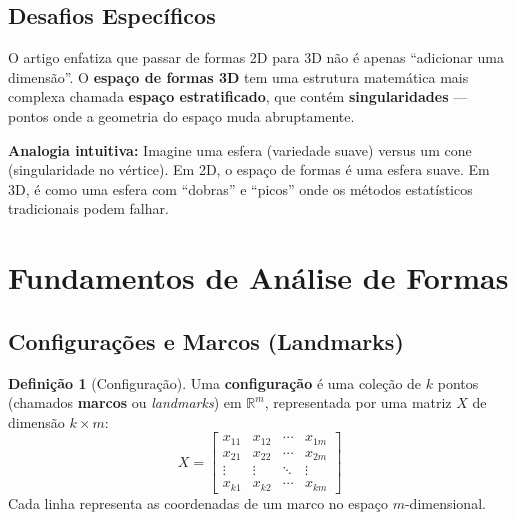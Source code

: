 \documentclass[12pt,a4paper]{article}
\theoremstyle{definition}
\newtheorem{definicao}{Definição}[section]
\begin{document}
\subsection{Desafios Específicos}

\begin{tcolorbox}[caixaimportante={Por que formas 3D são mais difíceis que 2D?}]
O artigo enfatiza que passar de formas 2D para 3D não é apenas ``adicionar uma dimensão''. O \textbf{espaço de formas 3D} tem uma estrutura matemática mais complexa chamada \textbf{espaço estratificado}, que contém \textbf{singularidades} --- pontos onde a geometria do espaço muda abruptamente.

\textbf{Analogia intuitiva:} Imagine uma esfera (variedade suave) versus um cone (singularidade no vértice). Em 2D, o espaço de formas é uma esfera suave. Em 3D, é como uma esfera com ``dobras'' e ``picos'' onde os métodos estatísticos tradicionais podem falhar.
\end{tcolorbox}

\section{Fundamentos de Análise de Formas}

\subsection{Configurações e Marcos (Landmarks)}

\begin{definicao}[Configuração]
Uma \textbf{configuração} é uma coleção de $k$ pontos (chamados \textbf{marcos} ou \textit{landmarks}) em $\mathbb{R}^m$, representada por uma matriz $X$ de dimensão $k \times m$:
\[
X = \begin{bmatrix}
x_{11} & x_{12} & \cdots & x_{1m} \\
x_{21} & x_{22} & \cdots & x_{2m} \\
\vdots & \vdots & \ddots & \vdots \\
x_{k1} & x_{k2} & \cdots & x_{km}
\end{bmatrix}
\]
Cada linha representa as coordenadas de um marco no espaço $m$-dimensional.
\end{definicao}
\end{document}
